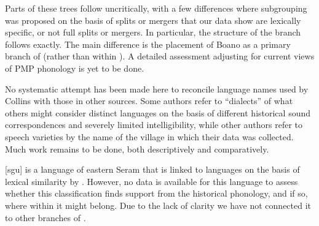 {}
Parts of these trees follow \citet{Collins1983} uncritically,
with a few differences where subgrouping was proposed on the
basis of splits or mergers that our data show are lexically specific,
or not full splits or mergers.
In particular, the structure of the 
branch follows \citet{Collins1983} exactly.
The main difference is the placement of Boano as a primary branch
of  (rather than within ).
A detailed assessment adjusting for current views of PMP phonology
is yet to be done.

No systematic attempt has been made here to reconcile language
names used by Collins with those in other sources.
Some authors refer to “dialects” of what others might consider
distinct languages on the basis of different historical sound
correspondences and severely limited intelligibility,
while other authors refer to speech varieties by the name of
the village in which their data was collected.
Much work remains to be done,
both descriptively and comparatively.

 [sgu] is a language of eastern Seram that is linked to
 languages on the basis of lexical similarity by \citet{LoskiLoski1989}.
However, no data is available for this language to assess whether
this classification finds support from the historical phonology,
and if so, where within  it might belong.
Due to the lack of clarity we have not connected it to other branches of .
\mbox{}\\

